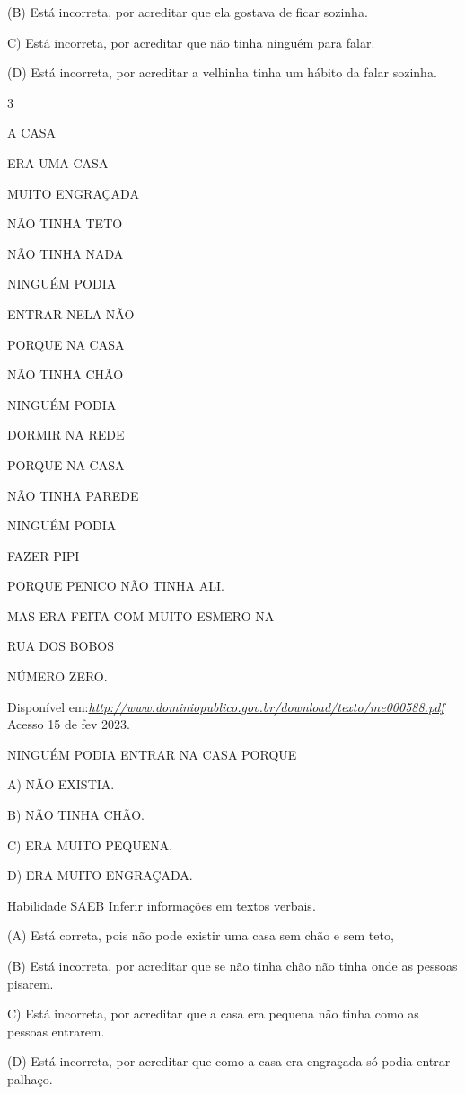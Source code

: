 \begin{escola}
(B) Está incorreta, por acreditar que ela gostava de ficar sozinha.

C) Está incorreta, por acreditar que não tinha ninguém para falar.

(D) Está incorreta, por acreditar a velhinha tinha um hábito da falar
sozinha.

\num{3}

A CASA

ERA UMA CASA

MUITO ENGRAÇADA

NÃO TINHA TETO

NÃO TINHA NADA

NINGUÉM PODIA

ENTRAR NELA NÃO

PORQUE NA CASA

NÃO TINHA CHÃO

NINGUÉM PODIA

DORMIR NA REDE

PORQUE NA CASA

NÃO TINHA PAREDE

NINGUÉM PODIA

FAZER PIPI

PORQUE PENICO NÃO TINHA ALI.

MAS ERA FEITA COM MUITO ESMERO NA

RUA DOS BOBOS

NÚMERO ZERO.

Disponível
em:\href{http://www.dominiopublico.gov.br/download/texto/me000588.pdf}{\emph{http://www.dominiopublico.gov.br/download/texto/me000588.pdf}}
Acesso 15 de fev 2023.

NINGUÉM PODIA ENTRAR NA CASA PORQUE

A) NÃO EXISTIA.

B) NÃO TINHA CHÃO.

C) ERA MUITO PEQUENA.

D) ERA MUITO ENGRAÇADA.

\protect\hypertarget{_heading=h.2p2csry}{}{}Habilidade SAEB Inferir
informações em textos verbais.

(A) Está correta, pois não pode existir uma casa sem chão e sem teto,

(B) Está incorreta, por acreditar que se não tinha chão não tinha onde
as pessoas pisarem.

C) Está incorreta, por acreditar que a casa era pequena não tinha como
as pessoas entrarem.

(D) Está incorreta, por acreditar que como a casa era engraçada só podia
entrar palhaço.


\end{escola}
